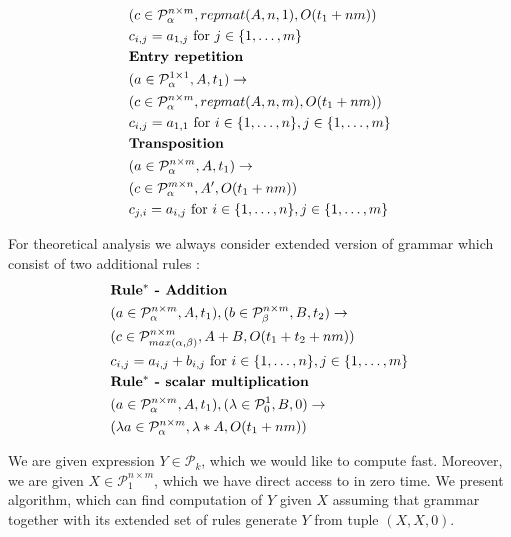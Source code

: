 \documentclass{article}
\begin{document}
\begin{align*}
&(c \in \mathcal{P}^{n \times m}_\alpha, repmat(A, n, 1), O(t_1 + nm)) \\
&c_{i, j} = a_{1, j} \text{ for } j \in \{1, \dots, m\}\\
&\text{{\bf Entry repetition}}\\
&(a \in \mathcal{P}^{1 \times 1}_\alpha, A, t_1) \rightarrow \\ 
&(c \in \mathcal{P}^{n \times m}_\alpha, repmat(A, n, m), O(t_1 + nm)) \\
&c_{i, j} = a_{1, 1} \text{ for } i \in \{1, \dots, n\}, j \in \{1, \dots, m\}\\
&\text{{\bf Transposition}}\\
&(a \in \mathcal{P}^{n \times m}_\alpha, A, t_1) \rightarrow \\ 
&(c \in \mathcal{P}^{m \times n}_\alpha, A', O(t_1 + nm)) \\
&c_{j, i} = a_{i, j} \text{ for } i \in \{1, \dots, n\}, j \in \{1, \dots, m\} \\
\label{grammar}
\end{align*}

For theoretical analysis we always consider extended version of grammar which consist of two additional rules : 
\begin{align*}
&\text{{\bf Rule$^*$ - Addition}}\\
&(a \in \mathcal{P}^{n \times m}_\alpha, A, t_1), (b \in \mathcal{P}^{n \times m}_\beta, B, t_2) \rightarrow \\ 
&(c \in \mathcal{P}^{n \times m}_{max(\alpha, \beta)}, A + B, O(t_1 + t_2 + nm)) \\
&c_{i,j} = a_{i,j} + b_{i, j} \text{ for } i \in \{1, \dots, n\}, j \in \{1, \dots, m\} \\
&\text{{\bf Rule$^*$ - scalar multiplication}}\\
&(a \in \mathcal{P}^{n \times m}_\alpha, A, t_1), (\lambda \in \mathcal{P}^{1}_0, B, 0) \rightarrow \\ 
&(\lambda a \in \mathcal{P}^{n \times m}_{\alpha}, \lambda * A, O(t_1 + nm)) \\
\end{align*}

We are given expression $Y \in \mathcal{P}_k$, which we would like to compute
fast. Moreover, we are given $X \in \mathcal{P}^{n \times m}_1$, which we have
direct access to in zero time. We present algorithm, which can find computation
of $Y$ given $X$ assuming that grammar together with its extended set of rules
generate $Y$ from tuple $(X, X, 0)$.
\end{document}
